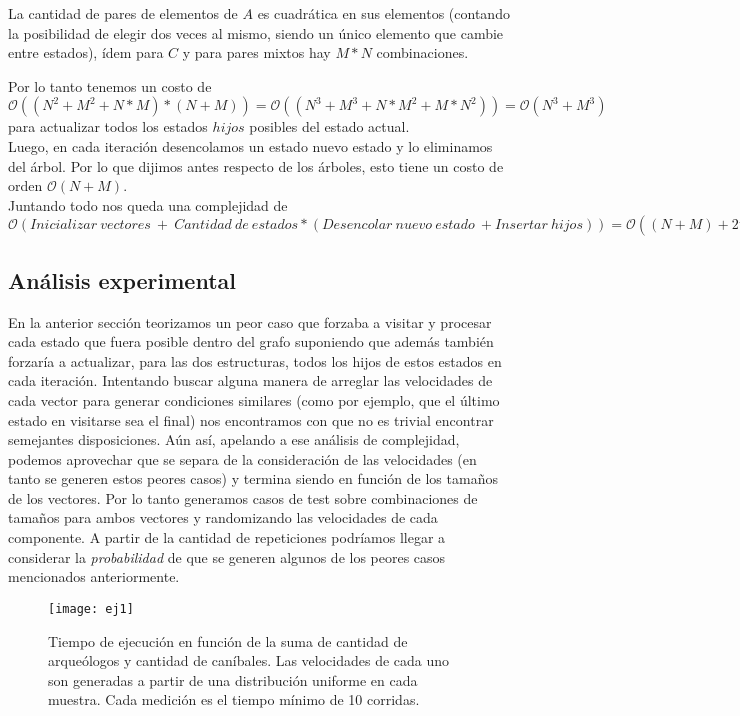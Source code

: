 La cantidad de pares de elementos de $A$ es cuadrática en sus elementos (contando la posibilidad de elegir dos veces al mismo, siendo un único elemento que cambie entre estados), ídem para $C$ y para pares mixtos hay $M*N$ combinaciones.

Por lo tanto tenemos un costo de $\mathcal{O}((N^2+M^2+N*M)*(N+M))=\mathcal{O}((N^3+M^3+N*M^2+M*N^2))=\mathcal{O}(N^3+M^3)$ para actualizar todos los estados $hijos$ posibles del estado actual. \\

Luego, en cada iteración desencolamos un estado nuevo estado y lo eliminamos del árbol. Por lo que dijimos antes respecto de los árboles, esto tiene un costo de orden $\mathcal{O}(N+M)$. \\

Juntando todo nos queda una complejidad de $\mathcal{O}(Inicializar\ vectores\ +\ Cantidad\ de\ estados*(Desencolar\ nuevo\ estado\ + Insertar\ hijos)) = \mathcal{O}((N+M)+2^{N+M}((N+M)+(N^3+M^3))) = \mathcal{O}(\ 2^{N+M}*(N^3+M^3)\ )$

\subsection{Análisis experimental}

En la anterior sección teorizamos un peor caso que forzaba a visitar y procesar cada estado que fuera posible dentro del grafo suponiendo que además también forzaría a actualizar, para las dos estructuras, todos los hijos de estos estados en cada iteración. Intentando buscar alguna manera de arreglar las velocidades de cada vector para generar condiciones similares (como por ejemplo, que el último estado en visitarse sea el final) nos encontramos con que no es trivial encontrar semejantes disposiciones. Aún así, apelando a ese análisis de complejidad, podemos aprovechar que se separa de la consideración de las velocidades (en tanto se generen estos peores casos) y termina siendo en función de los tamaños de los vectores. Por lo tanto generamos casos de test sobre combinaciones de tamaños para ambos vectores y randomizando las velocidades de cada componente. A partir de la cantidad de repeticiones podríamos llegar a considerar la \emph{probabilidad} de que se generen algunos de los peores casos mencionados anteriormente.	
\\

\begin{figure}[H]
    \centering
    \texttt{[image: ej1]}
    \caption{Tiempo de ejecución en función de la suma de cantidad de arqueólogos y cantidad de caníbales. Las velocidades de cada uno son generadas a partir de una distribución uniforme en cada muestra. Cada medición es el tiempo mínimo de 10 corridas.}
    \label{fig:ej1-fig}
\end{figure}

